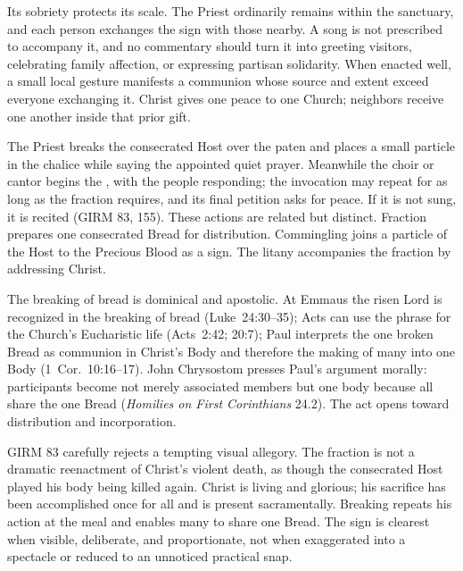 Its sobriety protects its scale. The Priest ordinarily remains within the sanctuary, and each person exchanges the sign with those nearby. A song is not prescribed to accompany it, and no commentary should turn it into greeting visitors, celebrating family affection, or expressing partisan solidarity. When enacted well, a small local gesture manifests a communion whose source and extent exceed everyone exchanging it. Christ gives one peace to one Church; neighbors receive one another inside that prior gift.


The Priest breaks the consecrated Host over the paten and places a small particle in the chalice while saying the appointed quiet prayer. Meanwhile the choir or cantor begins the , with the people responding; the invocation may repeat for as long as the fraction requires, and its final petition asks for peace. If it is not sung, it is recited (GIRM 83, 155). These actions are related but distinct. Fraction prepares one consecrated Bread for distribution. Commingling joins a particle of the Host to the Precious Blood as a sign. The litany accompanies the fraction by addressing Christ.

The breaking of bread is dominical and apostolic. At Emmaus the risen Lord is recognized in the breaking of bread (Luke~24:30--35); Acts can use the phrase for the Church's Eucharistic life (Acts~2:42; 20:7); Paul interprets the one broken Bread as communion in Christ's Body and therefore the making of many into one Body (1~Cor.~10:16--17). John Chrysostom presses Paul's argument morally: participants become not merely associated members but one body because all share the one Bread (\emph{Homilies on First Corinthians} 24.2). The act opens toward distribution and incorporation.

GIRM 83 carefully rejects a tempting visual allegory. The fraction is not a dramatic reenactment of Christ's violent death, as though the consecrated Host played his body being killed again. Christ is living and glorious; his sacrifice has been accomplished once for all and is present sacramentally. Breaking repeats his action at the meal and enables many to share one Bread. The sign is clearest when visible, deliberate, and proportionate, not when exaggerated into a spectacle or reduced to an unnoticed practical snap.


